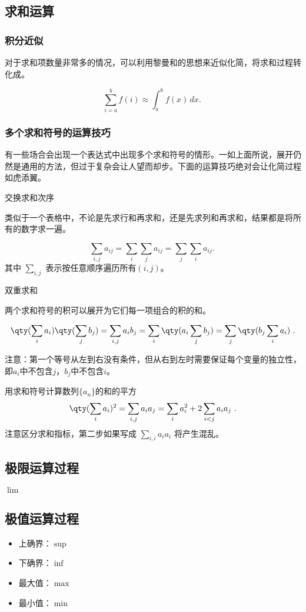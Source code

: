 \subsection{求和运算}

\subsubsection{积分近似}

对于求和项数量非常多的情况，可以利用黎曼和的思想来近似化简，将求和过程转化成。

\begin{equation}
\sum_{i=a}^b f(i) \approx \int_a^b f(x) \, dx.~
\end{equation}


\subsubsection{多个求和符号的运算技巧}

有一些场合会出现一个表达式中出现多个求和符号的情形。一如上面所说，展开仍然是通用的方法，但过于复杂会让人望而却步。下面的运算技巧绝对会让化简过程如虎添翼。

交换求和次序

类似于一个表格中，不论是先求行和再求和，还是先求列和再求和，结果都是将所有的数字求一遍。

\begin{equation}
\sum_{i,j} a_{ij}=\sum_{i} \sum_{j} a_{ij} = \sum_{j} \sum_{i} a_{ij}.~
\end{equation}
其中 $\sum\limits_{i,j}$ 表示按任意顺序遍历所有$(i,j)$。

双重求和

两个求和符号的积可以展开为它们每一项组合的积的和。

\begin{equation}
\qty(\sum_i a_i) \qty(\sum_j b_j) = \sum_{i,j} a_i b_j = \sum_i \qty(a_i \sum_j b_j) = \sum_j \qty(b_j \sum_i a_i)~.
\end{equation}

注意：第一个等号从左到右没有条件，但从右到左时需要保证每个变量的独立性，即$a_i$中不包含$j$，$b_j$中不包含$i$。

\begin{example}{用求和符号计算数列$\{a_n\}$的和的平方}
$$\qty(\sum_i a_i)^2 = \sum_{i,j} a_i a_j = \sum_i a_i^2 + 2\sum_{i<j} a_i a_j~.$$
注意区分求和指标，第二步如果写成 $\sum\limits_{i,i} a_i a_i$ 将产生混乱。
\end{example}
\subsection{极限运算过程}

$\lim$

\subsection{极值运算过程}

\begin{itemize}
\item 上确界：$\sup$
\item 下确界：$\inf$
\item 最大值：$\max$
\item 最小值：$\min$
\end{itemize}
